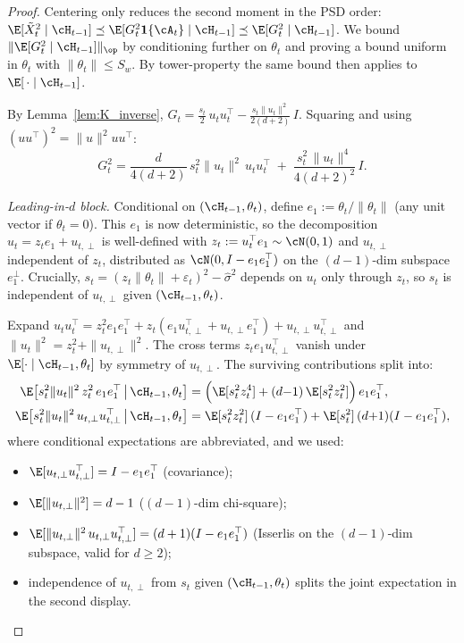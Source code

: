 \begin{proof}
Centering only reduces the second moment in the PSD order:
$\E[\tilde X_t^2\mid\cH_{t-1}]\preceq\E[G_t^2\mathbf 1\{\cA_t\}\mid\cH_{t-1}]\preceq\E[G_t^2\mid\cH_{t-1}]$.
We bound $\|\E[G_t^2\mid\cH_{t-1}]\|_\op$ by conditioning further on
$\theta_t$ and proving a bound uniform in $\theta_t$ with
$\|\theta_t\|\le S_w$. By tower-property the same bound then applies
to $\E[\,\cdot\mid\cH_{t-1}]$.

By Lemma~\ref{lem:K_inverse},
\(
G_t = \tfrac{s_t}{2}\,u_t u_t^\top - \tfrac{s_t\|u_t\|^2}{2(d{+}2)}\,I.
\)
Squaring and using $(uu^\top)^2 = \|u\|^2 uu^\top$:
\begin{equation}
G_t^2 = \frac{d}{4(d+2)}\,s_t^2\|u_t\|^2\, u_t u_t^\top
       \;+\;\frac{s_t^2\,\|u_t\|^4}{4(d+2)^2}\,I.
\label{eq:Gt_squared}
\end{equation}

\emph{Leading-in-$d$ block.}
Conditional on $(\cH_{t-1},\theta_t)$, define $e_1 := \theta_t/\|\theta_t\|$
(any unit vector if $\theta_t=0$). This $e_1$ is now deterministic, so
the decomposition $u_t = z_t e_1 + u_{t,\perp}$ is well-defined with
$z_t := u_t^\top e_1\sim\cN(0,1)$ and $u_{t,\perp}$ independent of
$z_t$, distributed as $\cN(0,I-e_1e_1^\top)$ on the $(d{-}1)$-dim
subspace $e_1^\perp$. Crucially, $s_t = (z_t\|\theta_t\|+\varepsilon_t)^2-\hat\sigma^2$
depends on $u_t$ only through $z_t$, so $s_t$ is independent of
$u_{t,\perp}$ given $(\cH_{t-1},\theta_t)$.

Expand $u_tu_t^\top = z_t^2 e_1e_1^\top + z_t(e_1 u_{t,\perp}^\top + u_{t,\perp}e_1^\top) + u_{t,\perp}u_{t,\perp}^\top$
and $\|u_t\|^2 = z_t^2 + \|u_{t,\perp}\|^2$. The cross terms $z_t e_1 u_{t,\perp}^\top$
vanish under $\E[\cdot\mid\cH_{t-1},\theta_t]$ by symmetry of
$u_{t,\perp}$. The surviving contributions split into:
\begin{align*}
\E\bigl[s_t^2\|u_t\|^2\,z_t^2\,e_1e_1^\top \,\big|\,\cH_{t-1},\theta_t\bigr]
&= \Bigl(\E[s_t^2 z_t^4] + (d{-}1)\,\E[s_t^2 z_t^2]\Bigr)\,e_1e_1^\top, \\
\E\bigl[s_t^2\|u_t\|^2\,u_{t,\perp}u_{t,\perp}^\top \,\big|\,\cH_{t-1},\theta_t\bigr]
&= \E[s_t^2 z_t^2]\,(I-e_1e_1^\top) + \E[s_t^2]\,(d{+}1)(I-e_1e_1^\top),
\end{align*}
where conditional expectations are abbreviated, and we used:
\begin{itemize}[leftmargin=1.5em,nosep]
\item $\E[u_{t,\perp}u_{t,\perp}^\top]=I-e_1e_1^\top$ (covariance);
\item $\E[\|u_{t,\perp}\|^2]=d-1$ ($(d{-}1)$-dim chi-square);
\item $\E[\|u_{t,\perp}\|^2\,u_{t,\perp}u_{t,\perp}^\top]=(d+1)(I-e_1e_1^\top)$
  (Isserlis on the $(d{-}1)$-dim subspace, valid for $d\ge 2$);
\item independence of $u_{t,\perp}$ from $s_t$ given $(\cH_{t-1},\theta_t)$
  splits the joint expectation in the second display.
\end{itemize}


\end{proof}
